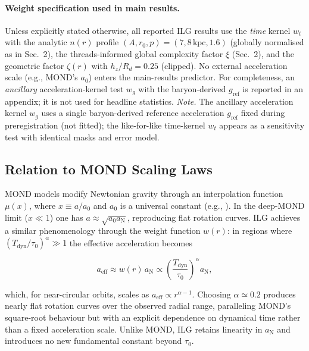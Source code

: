 \documentclass[usenatbib]{mnras}
\begin{document}
\paragraph{Weight specification used in main results.} Unless explicitly stated otherwise, all reported ILG results use the \emph{time} kernel $w_t$ with the analytic $n(r)$ profile $(A,r_0,p)=(7,8\,\mathrm{kpc},1.6)$ (globally normalised as in Sec.~2), the threads-informed global complexity factor $\xi$ (Sec.~2), and the geometric factor $\zeta(r)$ with $h_z/R_d=0.25$ (clipped). No external acceleration scale (e.g., MOND's $a_0$) enters the main-results predictor. For completeness, an \emph{ancillary} acceleration-kernel test $w_g$ with the baryon-derived $g_\mathrm{ref}$ is reported in an appendix; it is not used for headline statistics.
\noindent\textit{Note.} The ancillary acceleration kernel $w_g$ uses a single baryon-derived reference acceleration $g_\mathrm{ref}$ fixed during preregistration (not fitted); the like-for-like time-kernel $w_t$ appears as a sensitivity test with identical masks and error model.

\subsection{Relation to MOND Scaling Laws}

MOND models modify Newtonian gravity through an interpolation function $\mu(x)$, where $x \equiv a/a_0$ and $a_0$ is a universal constant (e.g., \citealp{milgrom1983,famaey2012}). In the deep-MOND limit ($x \ll 1$) one has $a \approx \sqrt{a_0 a_\mathrm{N}}$, reproducing flat rotation curves.  ILG achieves a similar phenomenology through the weight function $w(r)$: in regions where $(T_\mathrm{dyn}/\tau_0)^\alpha \gg 1$ the effective acceleration becomes

\begin{equation}
a_\mathrm{eff} \approx w(r) \, a_\mathrm{N} \propto \left(\frac{T_\mathrm{dyn}}{\tau_0}\right)^\alpha a_\mathrm{N},
\end{equation}

which, for near-circular orbits, scales as $a_\mathrm{eff} \propto r^{\alpha-1}$.  Choosing $\alpha \simeq 0.2$ produces nearly flat rotation curves over the observed radial range, paralleling MOND's square-root behaviour but with an explicit dependence on dynamical time rather than a fixed acceleration scale.  Unlike MOND, ILG retains linearity in $a_\mathrm{N}$ and introduces no new fundamental constant beyond $\tau_0$.
\end{document}
